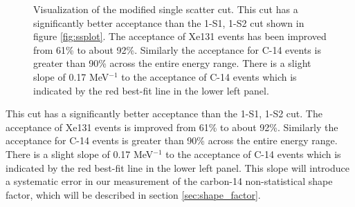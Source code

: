 \begin{figure}[h!]
\begin{subfigure}{0.5\textwidth}
\end{subfigure}
\caption{Visualization of the modified single scatter cut. This cut has a significantly better acceptance than the 1-S1, 1-S2 cut shown in figure \ref{fig:ssplot}. The acceptance of Xe131 events has been improved from 61\% to about  92\%. Similarly the acceptance for C-14 events is greater than 90\% across the entire energy range. There is a slight slope of 0.17 MeV$^{-1}$ to the acceptance of C-14 events which is indicated by the red best-fit line in the lower left panel. }
\label{fig:ssplot_new}
\end{figure} 

This cut has a significantly better acceptance than the 1-S1, 1-S2 cut. The acceptance of Xe131 events is improved from 61\% to about  92\%. Similarly the acceptance for C-14 events is greater than 90\% across the entire energy range. There is a slight slope of 0.17 MeV$^{-1}$ to the acceptance of C-14 events which is indicated by the red best-fit line in the lower left panel. This slope will introduce a systematic error in our measurement of the carbon-14 non-statistical shape factor, which will be described in section \ref{sec:shape_factor}. 

